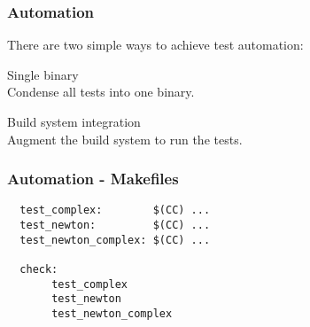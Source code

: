 \begin{frame}
  \frametitle{Automation}
  {\large
  There are two simple ways to achieve test automation:

  \vspace{0.5cm}
  {\color{Base09} Single binary}\\\hspace{0.5cm}Condense all tests into one binary.

  \vspace{0.5cm}
  {\color{Base09} Build system integration}\\\hspace{0.5cm}Augment the build system to run the tests.
  }
\end{frame}

\begin{frame}[fragile]
  \frametitle{Automation - Makefiles}
  \begin{example}
    \begin{lstlisting}
  test_complex:        $(CC) ...
  test_newton:         $(CC) ...
  test_newton_complex: $(CC) ... 

  check:
       test_complex
       test_newton
       test_newton_complex
    \end{lstlisting}
  \end{example}
\end{frame}
